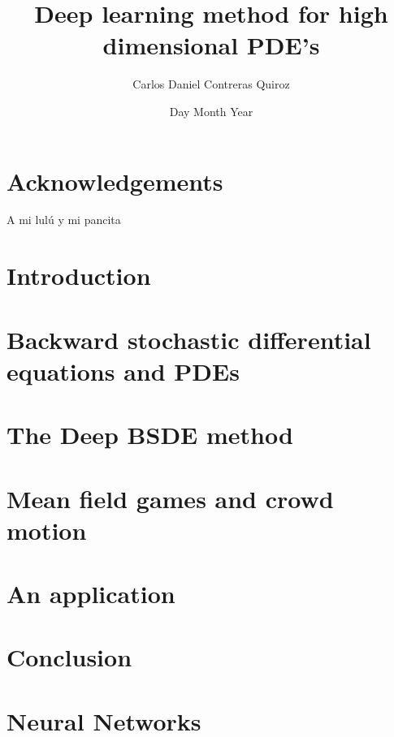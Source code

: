 \documentclass[11pt]{report}
\title{Deep learning method for high dimensional PDE's}
\author{Carlos Daniel Contreras Quiroz}
\date{Day Month Year}
\begin{document}





\chapter*{Acknowledgements}
A mi lulú y mi pancita


\tableofcontents






\chapter{Introduction}


\chapter{Backward stochastic differential equations and PDEs}


\chapter{The Deep BSDE method}


\chapter{Mean field games and crowd motion}


\chapter{An application}


\chapter{Conclusion}


\appendix
\chapter{Neural Networks}



\printbibliography
\end{document}
